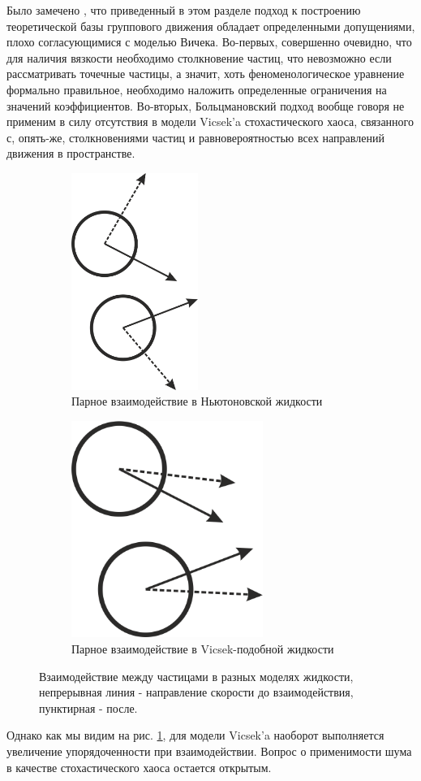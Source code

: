 	Было замечено \cite{kulinskii2009,chepizhko2013}, что приведенный в этом разделе подход к построению теоретической базы группового движения обладает определенными допущениями, плохо согласующимися с моделью Вичека. Во-первых, совершенно очевидно, что для наличия вязкости необходимо столкновение частиц, что невозможно если рассматривать точечные частицы, а значит, хоть феноменологическое уравнение формально правильное, необходимо наложить определенные ограничения на значений коэффициентов. Во-вторых, Больцмановский подход вообще говоря не применим в силу отсутствия в модели Vicsek'a стохастического хаоса, связанного с, опять-же, столкновениями частиц и равновероятностью всех направлений движения в пространстве.
	\begin{figure}[h]
	\centering
        \begin{subfigure}{0.45\textwidth}
                \includegraphics[height=200pt]{Images/NewtonInterractions}
                \caption{Парное взаимодействие в Ньютоновской жидкости}
        \end{subfigure}
        \begin{subfigure}{0.45\textwidth}
                \includegraphics[height=200pt]{Images/VicsekInterrcations}
                \caption{Парное взаимодействие в Vicsek-подобной жидкости}
        \end{subfigure}
        \caption{Взаимодействие между частицами в разных моделях жидкости, непрерывная линия - направление скорости до взаимодействия, пунктирная - после.}
        \label{fig:PairParticleInterractions}
	\end{figure}

	Однако как мы видим на рис. \ref{fig:PairParticleInterractions}, для модели Vicsek'a наоборот выполняется увеличение упорядоченности при взаимодействии. Вопрос о применимости шума в качестве стохастического хаоса остается открытым.
